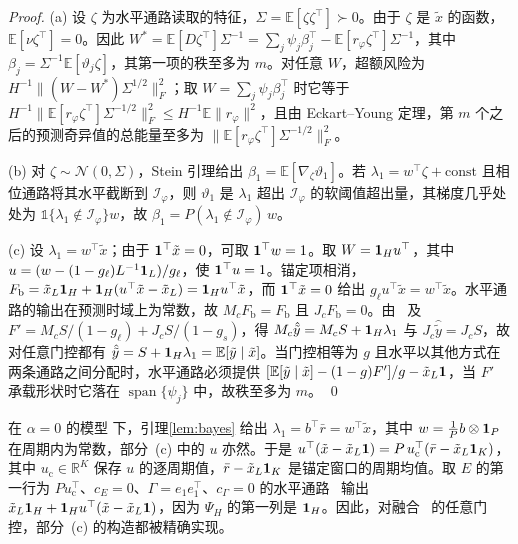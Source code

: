 {\begin{proof}
(a) 设 $\zeta$ 为水平通路读取的特征，$\Sigma=\mathbb E[\zeta\zeta^\top]\succ0$。由于 $\zeta$ 是 $\tilde x$ 的函数，$\mathbb E[\nu\zeta^\top]=0$。因此 $W^*=\mathbb E[D\zeta^\top]\Sigma^{-1}=\sum_j\psi_j\beta_j^\top-\mathbb E[r_\varphi\zeta^\top]\Sigma^{-1}$，其中 $\beta_j=\Sigma^{-1}\mathbb E[\vartheta_j\zeta]$，其第一项的秩至多为 $m$。对任意 $W$，超额风险为 $H^{-1}\|(W-W^*)\Sigma^{1/2}\|_F^2$；取 $W=\sum_j\psi_j\beta_j^\top$ 时它等于 $H^{-1}\|\mathbb E[r_\varphi\zeta^\top]\Sigma^{-1/2}\|_F^2\le H^{-1}\mathbb E\|r_\varphi\|^2$，且由 Eckart--Young 定理，第 $m$ 个之后的预测奇异值的总能量至多为 $\|\mathbb E[r_\varphi\zeta^\top]\Sigma^{-1/2}\|_F^2$。

(b) 对 $\zeta\sim\mathcal N(0,\Sigma)$，Stein 引理给出 $\beta_1=\mathbb E[\nabla_\zeta\vartheta_1]$。若 $\lambda_1=w^\top\zeta+\text{const}$ 且相位通路将其水平截断到 $\mathcal I_\varphi$，则 $\vartheta_1$ 是 $\lambda_1$ 超出 $\mathcal I_\varphi$ 的软阈值超出量，其梯度几乎处处为 $\mathbb 1\{\lambda_1\notin\mathcal I_\varphi\}w$，故 $\beta_1=P(\lambda_1\notin\mathcal I_\varphi)\,w$。

(c) 设 $\lambda_1=w^\top\tilde x$；由于 $\mathbf 1^\top\tilde x=0$，可取 $\mathbf 1^\top w=1$。取 $W=\mathbf 1_Hu^\top$，其中 $u=(w-(1-g_\ell)L^{-1}\mathbf 1_L)/g_\ell$，使 $\mathbf 1^\top u=1$。锚定项相消，$F_{\mathrm b}=\tilde x_L\mathbf 1_H+\mathbf 1_H(u^\top\tilde x-\tilde x_L)=\mathbf 1_Hu^\top\tilde x$，而 $\mathbf 1^\top\tilde x=0$ 给出 $g_\ell u^\top\tilde x=w^\top\tilde x$。水平通路的输出在预测时域上为常数，故 $M_cF_{\mathrm b}=F_{\mathrm b}$ 且 $J_cF_{\mathrm b}=0$。由~ 及 $F'=M_cS/(1-g_\ell)+J_cS/(1-g_s)$，得 $M_c\hat{\tilde y}=M_cS+\mathbf 1_H\lambda_1$ 与 $J_c\hat{\tilde y}=J_cS$，故对任意门控都有 $\hat{\tilde y}=S+\mathbf 1_H\lambda_1=\mathbb E[\tilde y\mid\tilde x]$。当门控相等为 $g$ 且水平以其他方式在两条通路之间分配时，水平通路必须提供 $[\mathbb E[\tilde y\mid\tilde x]-(1-g)F']/g-\tilde x_L\mathbf 1$，当 $F'$ 承载形状时它落在 $\operatorname{span}\{\psi_j\}$ 中，故秩至多为 $m$。 \qed
\end{proof}

在 $\alpha=0$ 的模型  下，引理\ref{lem:bayes} 给出 $\lambda_1=b^\top\bar r=w^\top\tilde x$，其中 $w=\tfrac1Pb\otimes\mathbf 1_P$ 在周期内为常数，部分~(c) 中的 $u$ 亦然。于是 $u^\top(\tilde x-\tilde x_L\mathbf 1)=P\,u_{\mathrm c}^\top(\bar r-\tilde x_L\mathbf 1_K)$，其中 $u_{\mathrm c}\in\mathbb R^K$ 保存 $u$ 的逐周期值，$\bar r-\tilde x_L\mathbf 1_K$ 是锚定窗口的周期均值。取 $E$ 的第一行为 $Pu_{\mathrm c}^\top$、$c_E=0$、$\Gamma=e_1e_1^\top$、$c_\Gamma=0$ 的水平通路~ 输出 $\tilde x_L\mathbf 1_H+\mathbf 1_Hu^\top(\tilde x-\tilde x_L\mathbf 1)$，因为 $\Psi_H$ 的第一列是 $\mathbf 1_H$。因此，对融合~ 的任意门控，部分~(c) 的构造都被精确实现。

}
